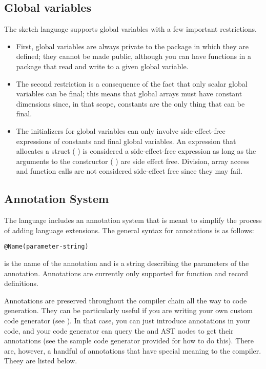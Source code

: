 \subsection{Global variables}
The sketch language supports global variables with a few important restrictions.
\begin{itemize}
\item First, global variables are always private to the package in which they are defined; they cannot be made public, although you can have functions in a package that read and write to a given global variable. 
\item The second restriction is a consequence of the fact that only scalar global variables can be final; this means that global arrays must have constant dimensions since, in that scope, constants are the only thing that can be final.

\item The initializers for global variables can only involve side-effect-free expressions of constants and final global variables. An expression that allocates a struct (\eg{} ) is considered a side-effect-free expression as long as the arguments to the constructor (\eg{} ) are side effect free. Division, array access and function calls are not considered side-effect free since they may fail.
\end{itemize}

\subsection{Annotation System}
The \Sk{} language includes an annotation system that is meant to simplify the process of adding language extensions. The general syntax for annotations is as follows:
\begin{lstlisting}
@Name(parameter-string)
\end{lstlisting}
 is the name of the annotation and  is a string describing the parameters of the annotation. Annotations are currently only supported for function and record definitions. 


Annotations are preserved throughout the compiler chain all the way to code generation. They can be particularly useful if you are writing your own custom code generator (see ). In that case, you can just introduce annotations in your code, and your code generator can query the  and   AST nodes to get their annotations (see the sample code generator provided for how to do this). There are, however, a handful of annotations that have special meaning to the compiler. Theey are listed below.


